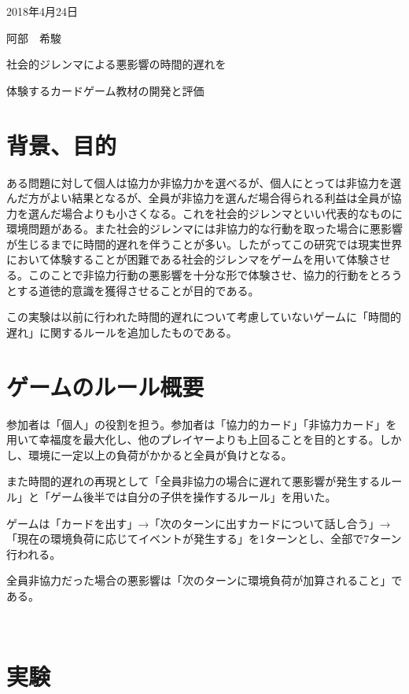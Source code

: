 \documentclass[a4j,11pt]{jsarticle}
\begin{document}
\begin{flushright} %
2018年4月24日

阿部　希駿
\end{flushright}

\begin{center}
\Large{社会的ジレンマによる悪影響の時間的遅れを

体験するカードゲーム教材の開発と評価}
\end{center}

\section{背景、目的}
\label{sec:mokuteki}
ある問題に対して個人は協力か非協力かを選べるが、個人にとっては非協力を選んだ方がよい結果となるが、全員が非協力を選んだ場合得られる利益は全員が協力を選んだ場合よりも小さくなる。これを社会的ジレンマといい代表的なものに環境問題がある。また社会的ジレンマには非協力的な行動を取った場合に悪影響が生じるまでに時間的遅れを伴うことが多い。したがってこの研究では現実世界において体験することが困難である社会的ジレンマをゲームを用いて体験させる。このことで非協力行動の悪影響を十分な形で体験させ、協力的行動をとろうとする道徳的意識を獲得させることが目的である。

この実験は以前に行われた時間的遅れについて考慮していないゲームに「時間的遅れ」に関するルールを追加したものである。


\section{ゲームのルール概要}
\label{sec:kihon}
参加者は「個人」の役割を担う。参加者は「協力的カード」「非協力カード」を用いて幸福度を最大化し、他のプレイヤーよりも上回ることを目的とする。しかし、環境に一定以上の負荷がかかると全員が負けとなる。

また時間的遅れの再現として「全員非協力の場合に遅れて悪影響が発生するルール」と「ゲーム後半では自分の子供を操作するルール」を用いた。

ゲームは「カードを出す」→「次のターンに出すカードについて話し合う」→「現在の環境負荷に応じてイベントが発生する」を1ターンとし、全部で7ターン行われる。

全員非協力だった場合の悪影響は「次のターンに環境負荷が加算されること」である。

　

\section{実験}
\end{document}

